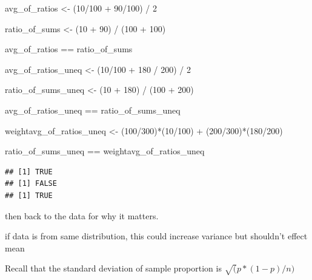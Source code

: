 \documentclass[
]{krantz}
\makeatletter
\newenvironment{Shaded}{\begin{snugshade}}{\end{snugshade}}
\newcommand{\DecValTok}[1]{\textcolor[rgb]{0.06,0.06,0.06}{#1}}
\newcommand{\NormalTok}[1]{#1}
\newcommand{\OtherTok}[1]{\textcolor[rgb]{0.37,0.37,0.37}{#1}}
\newcommand{\SpecialCharTok}[1]{\textcolor[rgb]{0,0,0}{#1}}
\newenvironment{kframe}{%
\medskip{}
\setlength{\fboxsep}{.8em}
 \def\at@end@of@kframe{}%
 \ifinner\ifhmode%
  \def\at@end@of@kframe{\end{minipage}}%
  \begin{minipage}{\columnwidth}%
 \fi\fi%
 \def\FrameCommand##1{\hskip\@totalleftmargin \hskip-\fboxsep
 \colorbox{shadecolor}{##1}\hskip-\fboxsep
     \hskip-\linewidth \hskip-\@totalleftmargin \hskip\columnwidth}%
 \MakeFramed {\advance\hsize-\width
   \@totalleftmargin\z@ \linewidth\hsize
   \@setminipage}}%
 {\par\unskip\endMakeFramed%
 \at@end@of@kframe}
\renewenvironment{Shaded}{\begin{kframe}}{\end{kframe}}
\makeatother
\begin{document}
\begin{Shaded}
\begin{Highlighting}[]
\NormalTok{avg\_of\_ratios }\OtherTok{\textless{}{-}}\NormalTok{ (}\DecValTok{10}\SpecialCharTok{/}\DecValTok{100} \SpecialCharTok{+} \DecValTok{90}\SpecialCharTok{/}\DecValTok{100}\NormalTok{) }\SpecialCharTok{/} \DecValTok{2}

\NormalTok{ratio\_of\_sums }\OtherTok{\textless{}{-}}\NormalTok{ (}\DecValTok{10} \SpecialCharTok{+} \DecValTok{90}\NormalTok{) }\SpecialCharTok{/}\NormalTok{ (}\DecValTok{100} \SpecialCharTok{+} \DecValTok{100}\NormalTok{)}

\NormalTok{avg\_of\_ratios }\SpecialCharTok{==}\NormalTok{ ratio\_of\_sums}

\NormalTok{avg\_of\_ratios\_uneq }\OtherTok{\textless{}{-}}\NormalTok{ (}\DecValTok{10}\SpecialCharTok{/}\DecValTok{100} \SpecialCharTok{+} \DecValTok{180} \SpecialCharTok{/} \DecValTok{200}\NormalTok{) }\SpecialCharTok{/} \DecValTok{2}

\NormalTok{ratio\_of\_sums\_uneq }\OtherTok{\textless{}{-}}\NormalTok{ (}\DecValTok{10} \SpecialCharTok{+} \DecValTok{180}\NormalTok{) }\SpecialCharTok{/}\NormalTok{ (}\DecValTok{100} \SpecialCharTok{+} \DecValTok{200}\NormalTok{)}

\NormalTok{avg\_of\_ratios\_uneq }\SpecialCharTok{==}\NormalTok{ ratio\_of\_sums\_uneq}

\NormalTok{weightavg\_of\_ratios\_uneq }\OtherTok{\textless{}{-}}\NormalTok{ (}\DecValTok{100}\SpecialCharTok{/}\DecValTok{300}\NormalTok{)}\SpecialCharTok{*}\NormalTok{(}\DecValTok{10}\SpecialCharTok{/}\DecValTok{100}\NormalTok{) }\SpecialCharTok{+}\NormalTok{ (}\DecValTok{200}\SpecialCharTok{/}\DecValTok{300}\NormalTok{)}\SpecialCharTok{*}\NormalTok{(}\DecValTok{180}\SpecialCharTok{/}\DecValTok{200}\NormalTok{)}

\NormalTok{ratio\_of\_sums\_uneq }\SpecialCharTok{==}\NormalTok{ weightavg\_of\_ratios\_uneq}
\end{Highlighting}
\end{Shaded}

\begin{verbatim}
## [1] TRUE
## [1] FALSE
## [1] TRUE
\end{verbatim}

then back to the data for why it matters.

if data is from same distribution, this could increase variance but shouldn't effect mean

Recall that the standard deviation of sample proportion is \(\sqrt(p*(1-p)/n)\)
\end{document}
